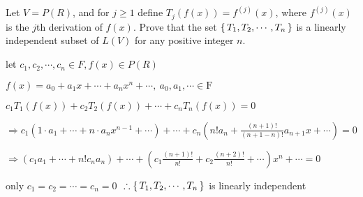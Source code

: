 Let $V = P(R)$, and for $j \geq 1$ define $T_j(f(x)) = f^{(j)}(x)$, where $f^{(j)}(x)$ is the $j$th derivation of $f(x)$. Prove that the set $\left\{ \,T_1,T_2,\cdots,T_n \,\right\}$ is a linearly independent subset of $L(V)$ for any positive integer $n$.

\begin{tcolorbox}
	let $c_1,c_2,\cdots,c_n \in F, f(x) \in P(R)$
	
	$f(x) = a_0 + a_1x + \cdots + a_nx^n + \cdots,~ a_0,a_1,\cdots \in \mathrm{F}$
	
	$c_1T_1(f(x)) + c_2T_2(f(x)) + \cdots + c_nT_n(f(x)) = 0$
	
	$\Rightarrow c_1(1 \cdot a_1 +\cdots + n \cdot a_nx^{n-1}+\cdots)+\cdots + c_n(n!a_n + \frac{(n+1)!}{(n+1-n)!}a_{n+1}x+\cdots) = 0$
	
	$\Rightarrow (c_1a_1 + \cdots + n!c_na_n)+\cdots+(c_1\frac{(n+1)!}{n!}+c_2\frac{(n+2)!}{n!}+\cdots)x^n+\cdots =0$
	
	only $c_1 = c_2 = \cdots = c_n = 0$ $~\therefore \left\{ \,T_1,T_2,\cdots,T_n \,\right\}$ is linearly independent
\end{tcolorbox}